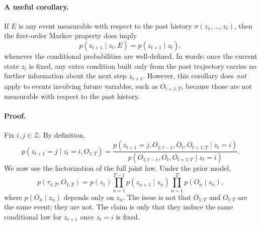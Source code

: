 \documentclass[11pt]{article}
\begin{document}
\paragraph{A useful corollary.}
If \(E\) is any event measurable with respect to the past history
\(\sigma(z_1,\dots,z_t)\), then the first-order Markov property does imply
\begin{equation}
    p(z_{t+1}\mid z_t,E)=p(z_{t+1}\mid z_t),
\end{equation}
whenever the conditional probabilities are well-defined. In words: once the current state
\(z_t\) is fixed, any extra condition built only from the past trajectory carries no further
information about the next step \(z_{t+1}\). However, this corollary does \emph{not} apply to
events involving future variables, such as \(O_{t+1:T}\), because those are not measurable
with respect to the past history.

\paragraph{Proof.}
Fix \(i,j\in\mathcal{Z}\). By definition,
\begin{equation}
    p(z_{t+1}=j\mid z_t=i,O_{1:T})
    =
    \frac{
        p(z_{t+1}=j,O_{1:t-1},O_t,O_{t+1:T}\mid z_t=i)
    }{
        p(O_{1:t-1},O_t,O_{t+1:T}\mid z_t=i)
    }.
    \label{eq:window-proof-start}
\end{equation}
We now use the factorization of the full joint law. Under the prior model,
\begin{equation}
    p(\tau_{1:T},O_{1:T})
    =
    p(z_1)\prod_{n=1}^{T-1}p(z_{n+1}\mid z_n)\prod_{n=1}^{T}p(O_n\mid z_n),
    \label{eq:full-joint-factorization}
\end{equation}
where \(p(O_n\mid z_n)\) depends only on \(z_n\). The issue is not that
\(O_{1:T}\) and \(O_{t:T}\) are the same event; they are not. The claim is only that they
induce the same conditional law for \(z_{t+1}\) once \(z_t=i\) is fixed.
\end{document}
